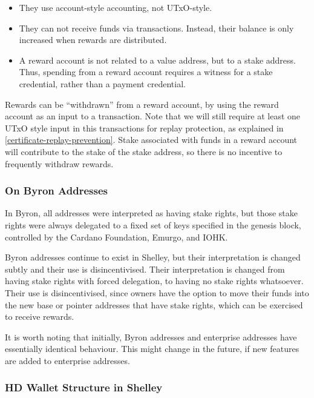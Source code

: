 \documentclass[11pt,a4paper,dvipsnames,twosided]{article}
\begin{document}
\begin{itemize}
\item They use account-style accounting, not UTxO-style.
\item They can not receive funds via transactions. Instead, their
  balance is only increased when rewards are distributed.
\item A reward account is not related to a value address, but to a stake
  address. Thus, spending from a reward account requires a witness for a stake
  credential, rather than a payment credential.
\end{itemize}

Rewards can be ``withdrawn'' from a reward account, by using the reward account
as an input to a transaction. Note that we will still require at least one UTxO
style input in this transactions for replay protection, as explained in
\cref{certificate-replay-prevention}. Stake associated with funds in a reward
account will contribute to the stake of the stake address, so there is no
incentive to frequently withdraw rewards.

\subsubsection{On Byron Addresses}
\label{bootstrap-address}

In Byron, all addresses were interpreted as
having stake rights, but those stake rights were always delegated to a fixed set
of keys specified in the genesis block, controlled by the
Cardano Foundation, Emurgo, and IOHK.

Byron addresses continue to exist in Shelley, but their
interpretation is changed subtly and their use is disincentivised.
Their interpretation is changed from having stake rights with
forced delegation, to having no stake rights whatsoever. Their use is
disincentivised, since owners have the option to move their funds into
the new base or pointer addresses that have stake rights, which can be
exercised to receive rewards.

It is worth noting that initially, Byron addresses and enterprise addresses
have essentially identical behaviour. This might change in the future, if new
features are added to enterprise addresses.

\subsubsection{HD Wallet Structure in Shelley}
\label{hd-wallet-structure-in-shelley}
\end{document}
